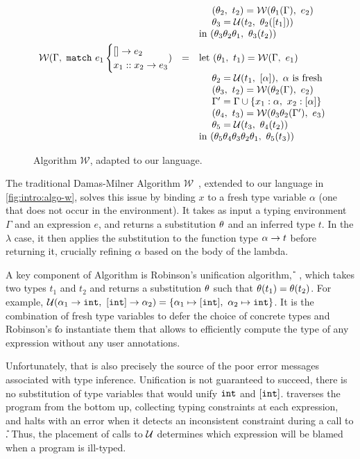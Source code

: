 \begin{figure}[p]
\[{\begin{array}{lcl}
   &   & \quad\ (\tsu_2,\ t_2) = \W(\tsu_1(\Gamma),\ e_2) \\
   &   & \quad\ \tsu_3 = \U(t_2,\ \tsu_2(\tlist{t_1})) \\
   &   & \text{in } (\tsu_3\tsu_2\tsu_1,\ \tsu_3(t_2))
\\[0.05in]
\W(\Gamma,\ \elcase{e_1}{e_2}{x_1}{x_2}{e_3})
   & = & \text{let } (\tsu_1,\ t_1) = \W(\Gamma,\ e_1) \\
   &   & \quad\ \tsu_2 = \U(t_1,\ \tlist{\alpha}),\ \alpha \text{ is fresh} \\
   &   & \quad\ (\tsu_3,\ t_2) = \W(\tsu_2(\Gamma),\ e_2) \\
   &   & \quad\ \Gamma' = \Gamma \cup \{x_1:\alpha,\ x_2:\tlist{\alpha}\} \\
   &   & \quad\ (\tsu_4,\ t_3) = \W(\tsu_3\tsu_2(\Gamma'),\ e_3) \\
   &   & \quad\ \tsu_5 = \U(t_3,\ \tsu_4(t_2)) \\
   &   & \text{in } (\tsu_5\tsu_4\tsu_3\tsu_2\tsu_1,\ \tsu_5(t_3)) \\
\end{array}
}
\]
\caption{Algorithm $\mathcal{W}$, adapted to our language.}
\label{fig:intro:algo-w}
\end{figure}

The traditional Damas-Milner Algorithm
$\mathcal{W}$~\citep{Damas1982-uw}, extended to our language in
\autoref{fig:intro:algo-w}, solves this issue by binding $x$ to a fresh
type variable $\alpha$ (\ie one that does not occur in the environment).
%
It takes as input a typing environment $\Gamma$ and an expression $e$,
and returns a substitution $\theta$ and an inferred type $t$.
%
In the $\lambda$ case, it then applies the substitution to the function
type $\alpha \rightarrow t$ before returning it, crucially refining $\alpha$
based on the body of the lambda.

A key component of Algorithm \W is Robinson's unification algorithm,
\U~\citep{Robinson1965-rk}, which takes two types $t_1$ and $t_2$ and
returns a substitution $\theta$ such that $\theta(t_1) = \theta(t_2)$.
%
For example,
$\U(\tarr{\alpha_1}{\tint},\ \tarr{\tlist{\tint}}{\alpha_2}) = \{\alpha_1 \mapsto \tlist{\tint},\ \alpha_2 \mapsto \tint\}$.
%
It is the combination of fresh type variables to defer the choice of
concrete types and Robinson's \U to instantiate them that allows \W to
efficiently compute the type of any expression without any user
annotations.

Unfortunately, that is also precisely the source of the poor error
messages associated with type inference.
%
Unification is not guaranteed to succeed, \eg there is no substitution
of type variables that would unify $\mathtt{int}$ and $[\mathtt{int}]$.
%
\W traverses the program from the bottom up, collecting
typing constraints at each expression, and halts with an error when it
detects an inconsistent constraint during a call to \U.
%
Thus, the placement of calls to $\mathcal{U}$ determines which expression
will be blamed when a program is ill-typed.

